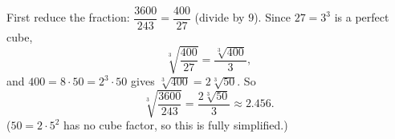 First reduce the fraction: $\dfrac{3600}{243}=\dfrac{400}{27}$ (divide by $9$). Since $27=3^3$ is a perfect cube,
\[\sqrt[3]{\dfrac{400}{27}}=\dfrac{\sqrt[3]{400}}{3},\]
and $400=8\cdot50=2^3\cdot50$ gives $\sqrt[3]{400}=2\sqrt[3]{50}$. So
\[\sqrt[3]{\dfrac{3600}{243}}=\boxed{\dfrac{2\sqrt[3]{50}}{3}}\approx2.456 .\]
($50=2\cdot5^2$ has no cube factor, so this is fully simplified.)
